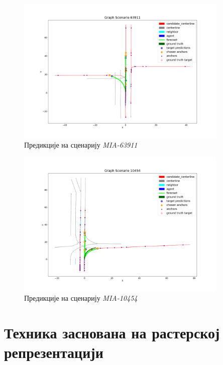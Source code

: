 \documentclass[11pt,oneside]{memoir}
\begin{document}
\begin{figure}[H]
  \centering
  \includegraphics[width=0.9\textwidth]{images/result_MIA_63911.png}
  \caption{Предикције на сценарију \textit{MIA-63911} \label{tnt-MIA-63911}}
\end{figure}

\begin{figure}[H]
  \centering
  \includegraphics[width=0.9\textwidth]{images/result_MIA_10454.png}
  \caption{Предикције на сценарију \textit{MIA-10454} \label{tnt-MIA-10454}}
\end{figure}

\chapter{Техника заснована на растерској репрезентацији}
\label{chp:razrada}
\end{document}
